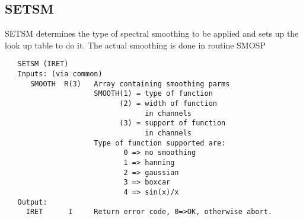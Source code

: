 \subsection{SETSM}
SETSM determines the type of spectral smoothing to be applied
and sets up the look up table to do it. The actual smoothing is
done in routine SMOSP
\begin{verbatim}
   SETSM (IRET)
   Inputs: (via common)
      SMOOTH  R(3)   Array containing smoothing parms
                     SMOOTH(1) = type of function
                           (2) = width of function
                                 in channels
                           (3) = support of function
                                 in channels
                     Type of function supported are:
                            0 => no smoothing
                            1 => hanning
                            2 => gaussian
                            3 => boxcar
                            4 => sin(x)/x
   Output:
     IRET      I     Return error code, 0=>OK, otherwise abort.
\end{verbatim}

